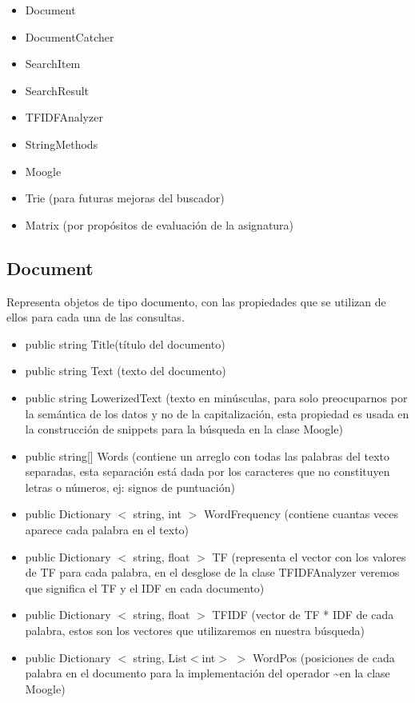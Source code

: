 \documentclass[a4paper,12pt]{article}
\begin{document}
\begin{itemize}
    \item Document
    \item DocumentCatcher
    \item SearchItem
    \item SearchResult
    \item TFIDFAnalyzer
    \item StringMethods
    \item Moogle
    \item Trie (para futuras mejoras del buscador)
    \item Matrix (por propósitos de evaluación de la asignatura)
\end{itemize}

\subsection{Document}\label{sub:doc}
Representa objetos de tipo documento, con las propiedades que se utilizan
de ellos para cada una de las consultas.
\begin{itemize}
    \item public string Title(título del documento)
    \item public string Text (texto del documento)
    \item public string LowerizedText (texto en minúsculas, para solo preocuparnos por la semántica de los
    datos y no de la capitalización, esta propiedad es usada en la construcción de snippets
    para la búsqueda en la clase Moogle)
    \item public string[] Words (contiene un arreglo con todas las palabras del texto separadas, esta separación
    está dada por los caracteres que no constituyen letras o números, ej: signos de
    puntuación)
    \item public Dictionary $<$ string, int $>$ WordFrequency (contiene cuantas veces aparece cada palabra en el texto)
    \item public Dictionary $<$ string, float $>$ TF (representa el vector con los valores de TF para cada palabra, en el desglose de la
    clase TFIDFAnalyzer veremos que significa el TF y el IDF en cada documento)
    \item public Dictionary $<$ string, float $>$ TFIDF (vector de TF * IDF de cada palabra, estos son los vectores que utilizaremos en
    nuestra búsqueda)
    \item public Dictionary $<$ string, List$<$int$>$ $>$ WordPos (posiciones de cada palabra en el documento para la implementación del
    operador \textasciitilde en la clase Moogle)
\end{itemize}
\end{document}
